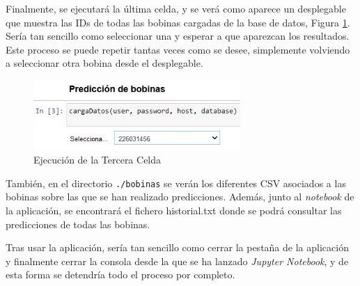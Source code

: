 Finalmente, se ejecutará la última celda, y se verá como aparece un desplegable que muestra las IDs de todas las bobinas cargadas de la base de datos, Figura \ref{f:celda3}. Sería tan sencillo como seleccionar una y esperar a que aparezcan los resultados. Este proceso se puede repetir tantas veces como se desee, simplemente volviendo a seleccionar otra bobina desde el desplegable.

\begin{figure}[h]
 \centering
  \includegraphics[width=0.7\textwidth]{img/celda3.PNG}
 \caption{Ejecución de la Tercera Celda}
 \label{f:celda3}
\end{figure}

También, en el directorio \texttt{./bobinas} se verán los diferentes CSV asociados a las bobinas sobre las que se han realizado predicciones. Además, junto al \emph{notebook} de la aplicación, se encontrará el fichero historial.txt donde se podrá consultar las predicciones de todas las bobinas.

Tras usar la aplicación, sería tan sencillo como cerrar la pestaña de la aplicación y finalmente cerrar la consola desde la que se ha lanzado \emph{Jupyter Notebook}, y de esta forma se detendría todo el proceso por completo.